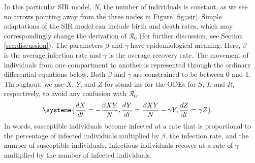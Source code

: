 \documentclass[12pt]{article}
\newcommand{\rr}{\ensuremath{\mathcal{R}_0}}
\begin{document}
In this particular  SIR model, $N$, the number of individuals is constant, as we see no arrows pointing away from the three nodes in Figure \ref{fig::sir}. Simple adaptations of the SIR model can include birth and death rates, which may correspondingly change the derivation of $\rr$ (for further discussion, see Section \ref{sec:discussion}). The parameters  $\beta$ and $\gamma$ have epidemiological meaning.  Here, $\beta$ is the average infection rate and $\gamma$ is the average recovery rate.  The movement of individuals from one compartment to another is represented through the ordinary differential equations below.  Both $\beta$ and $\gamma$ are constrained to be between $0$ and $1$.  Throughout, we use $X$, $Y$, and $Z$ for stand-ins for the ODEs for $S$, $I$, and $R$, respectively, to avoid any confusion with $\rr$.
\begin{align}
\systeme{\frac{dX}{dt} = -\frac{\beta XY}{N}, \frac{dY}{dt} = \frac{\beta XY}{N} - \gamma Y, \frac{dZ}{dt} = \gamma Z}. \label{eq:sir}
\end{align}
In words, susceptible individuals become infected at a rate that is proportional to the percentage of infected individuals multiplied by $\beta$, the infection rate, and the number of susceptible individuals.  Infectious individuals recover at a rate of $\gamma$ multiplied by the number of infected individuals.
\end{document}
